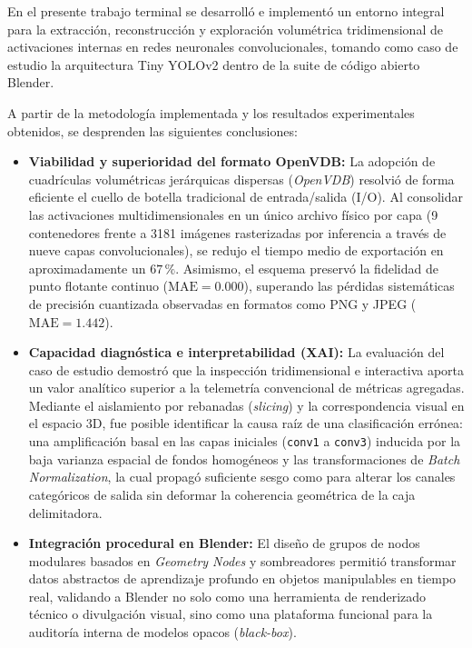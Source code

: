 En el presente trabajo terminal se desarrolló e implementó un entorno integral para la extracción, reconstrucción y exploración volumétrica 
tridimensional de activaciones internas en redes neuronales convolucionales, tomando como caso de estudio la arquitectura Tiny YOLOv2 dentro 
de la suite de código abierto Blender.
\medskip

A partir de la metodología implementada y los resultados experimentales obtenidos, se desprenden las siguientes conclusiones:

\begin{itemize}
    \item \textbf{Viabilidad y superioridad del formato OpenVDB:} La adopción de cuadrículas volumétricas jerárquicas dispersas 
    (\textit{OpenVDB}) resolvió de forma eficiente el cuello de botella tradicional de entrada/salida (I/O). Al consolidar las 
    activaciones multidimensionales en un único archivo físico por capa (9 contenedores frente a 3181 imágenes rasterizadas por 
    inferencia a través de nueve capas convolucionales), se redujo el tiempo medio de exportación en aproximadamente un $67\,\%$. 
    Asimismo, el esquema preservó la fidelidad de punto flotante continuo ($\text{MAE} = 0.000$), superando las pérdidas sistemáticas 
    de precisión cuantizada observadas en formatos como PNG y JPEG ($\text{MAE} = 1.442$).

    \item \textbf{Capacidad diagnóstica e interpretabilidad (XAI):} La evaluación del caso de estudio demostró que la inspección tridimensional 
    e interactiva aporta un valor analítico superior a la telemetría convencional de métricas agregadas. Mediante el aislamiento por rebanadas 
    (\textit{slicing}) y la correspondencia visual en el espacio 3D, fue posible identificar la causa raíz de una clasificación errónea: una 
    amplificación basal en las capas iniciales (\texttt{conv1} a \texttt{conv3}) inducida por la baja varianza espacial de fondos homogéneos y 
    las transformaciones de \textit{Batch Normalization}, la cual propagó suficiente sesgo como para alterar los canales categóricos de salida 
    sin deformar la coherencia geométrica de la caja delimitadora.
    
    \item \textbf{Integración procedural en Blender:} El diseño de grupos de nodos modulares basados en \textit{Geometry Nodes} y sombreadores 
    permitió transformar datos abstractos de aprendizaje profundo en objetos manipulables en tiempo real, validando a Blender no solo como una 
    herramienta de renderizado técnico o divulgación visual, sino como una plataforma funcional para la auditoría interna de modelos opacos 
    (\textit{black-box}).
\end{itemize}

